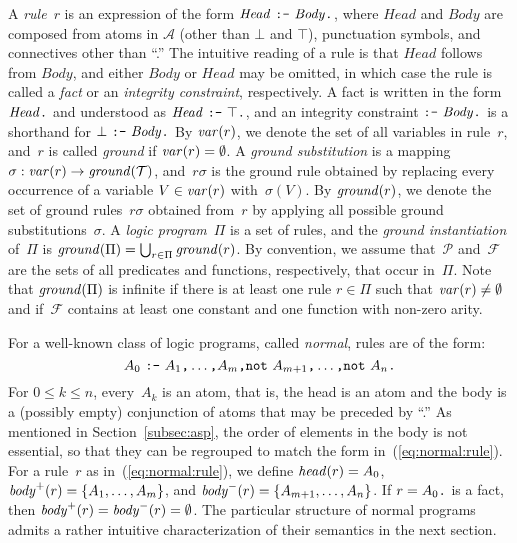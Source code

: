 A \emph{rule}~$r$ is an expression of the form $\mathit{Head}~\texttt{:-}~\mathit{Body}\texttt{.}$,
where $\mathit{Head}$ and $\mathit{Body}$ are composed from atoms in $\mathcal{A}$
(other than $\bot$ and $\top$), punctuation symbols, and connectives other than ``\code{:-}.''
The intuitive reading of a rule is that $\mathit{Head}$ follows from $\mathit{Body}$,
and either $\mathit{Body}$ or $\mathit{Head}$ may be omitted, in which case the
rule is called a \emph{fact} or an \emph{integrity constraint}, respectively.
A fact is written in the form $\mathit{Head}\texttt{.}$ and understood as 
$\mathit{Head}~\texttt{:-}~\top\texttt{.}$, and an integrity constraint
$\texttt{:-}~\mathit{Body}\texttt{.}$ is a shorthand for $\bot~\texttt{:-}~\mathit{Body}\texttt{.}$
By $\mathit{var}(r)$, we denote the set of all variables in rule~$r$,
and~$r$ is called \emph{ground} if $\mathit{var}(r)=\emptyset$.
A \emph{ground substitution} is a mapping $\sigma:\mathit{var}(r)\rightarrow\mathit{ground}(\mathcal{T})$,
and~$r\sigma$ is the ground rule obtained by replacing every occurrence of a
variable $V\in\mathit{var}(r)$ with~$\sigma(V)$.
By $\mathit{ground}(r)$, we denote the set of ground rules~$r\sigma$
obtained from~$r$ by applying all possible ground substitutions~$\sigma$.
A \emph{logic program}~$\Pi$ is a set of rules,
and the \emph{ground instantiation} of~$\Pi$ is
$\mathit{ground}(\Pi)=\bigcup_{r\in\Pi}\mathit{ground}(r)$.
By convention, we assume that~$\mathcal{P}$ and~$\mathcal{F}$ are the sets
of all predicates and functions, respectively, that occur in~$\Pi$.
Note that $\mathit{ground}(\Pi)$ is infinite if
there is at least one rule $r\in\Pi$ such that $\mathit{var}(r)\neq\emptyset$ and 
if~$\mathcal{F}$ contains at least one constant and one function
with non-zero arity.

For a well-known class of logic programs, called \emph{normal},
rules are of the form:
\begin{equation}\label{eq:normal:rule}
  A_0~\texttt{:-}~A_1\texttt{,}\dots\texttt{,}A_m\texttt{,}
  \texttt{not}~A_{m+1}\texttt{,}\dots\texttt{,}\texttt{not}~A_n\texttt{.}
\end{equation}
%
For $0\leq k\leq n$, every~$A_k$ is an atom, that is, the head is an atom and
the body is a (possibly empty) conjunction of atoms that may be preceded by ``.''
As mentioned in Section~\ref{subsec:asp},
the order of elements in the body is not essential,
so that they can be regrouped to match the form in~(\ref{eq:normal:rule}).
For a rule~$r$ as in~(\ref{eq:normal:rule}), we define 
$\mathit{head}(r)=A_0$, $\mathit{body}^+(r)=\{A_1,\dots,A_m\}$, and $\mathit{body}^-(r)=\{A_{m+1},\dots,A_n\}$.
If $r=A_0\texttt{.}$ is a fact, then
$\pbody{r}=\nbody{r}=\nolinebreak\emptyset$.
The particular structure of normal programs admits a rather intuitive 
characterization of their semantics in the next section.

